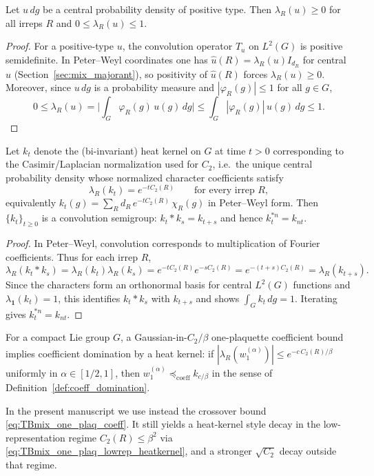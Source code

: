 \begin{lemma}\label{lem:pos_type_nonneg_coeff}
Let $u\,dg$ be a central probability density of positive type. Then $\lambda_R(u)\ge 0$ for all irreps $R$ and
$0\le \lambda_R(u)\le 1$.
\end{lemma}
\begin{proof}
For a positive-type $u$, the convolution operator $T_u$ on $L^2(G)$ is positive semidefinite.
In Peter--Weyl coordinates one has $\widehat u(R)=\lambda_R(u)I_{d_R}$ for central $u$ (Section~\ref{sec:mix_majorant}),
so positivity of $\widehat u(R)$ forces $\lambda_R(u)\ge 0$.
Moreover, since $u\,dg$ is a probability measure and $|\varphi_R(g)|\le 1$ for all $g\in G$,
\[
0\le \lambda_R(u)=\Big|\int_G \varphi_R(g)\,u(g)\,dg\Big|\le \int_G |\varphi_R(g)|\,u(g)\,dg\le 1.
\]
\end{proof}

\begin{lemma}\label{lem:heat_kernel_coeff}
Let $k_t$ denote the (bi-invariant) heat kernel on $G$ at time $t>0$ corresponding to the Casimir/Laplacian normalization used for $C_2$,
i.e.\ the unique central probability density whose normalized character coefficients satisfy
\[
\lambda_R(k_t)=e^{-tC_2(R)}
\qquad\text{for every irrep }R,
\]
equivalently
$
k_t(g)=\sum_R d_R\,e^{-tC_2(R)}\,\chi_R(g)
$
in Peter--Weyl form.
Then $\{k_t\}_{t\ge 0}$ is a convolution semigroup: $k_t*k_s=k_{t+s}$ and hence $k_t^{*n}=k_{nt}$.
\end{lemma}
\begin{proof}
In Peter--Weyl, convolution corresponds to multiplication of Fourier coefficients.
Thus for each irrep $R$,
\[
\lambda_R(k_t*k_s)=\lambda_R(k_t)\lambda_R(k_s)=e^{-tC_2(R)}e^{-sC_2(R)}=e^{-(t+s)C_2(R)}=\lambda_R(k_{t+s}).
\]
Since the characters form an orthonormal basis for central $L^2(G)$ functions and $\lambda_{\mathbf 1}(k_t)=1$,
this identifies $k_t*k_s$ with $k_{t+s}$ and shows $\int_G k_t\,dg=1$.
Iterating gives $k_t^{*n}=k_{nt}$.
\end{proof}


\begin{remark}\label{rem:plaq_as_heatkernel_dom}
For a compact Lie group $G$, a Gaussian-in-$C_2/\beta$ one-plaquette coefficient bound implies coefficient domination by a heat kernel:
if $|\lambda_R(w_1^{(\alpha)})|\le e^{-c\,C_2(R)/\beta}$ uniformly in $\alpha\in[1/2,1]$, then
$w_1^{(\alpha)} \preceq_{\mathrm{coeff}} k_{c/\beta}$ in the sense of Definition~\ref{def:coeff_domination}.

In the present manuscript we use instead the crossover bound \eqref{eq:TBmix_one_plaq_coeff}.
It still yields a heat-kernel style decay in the low-representation regime $C_2(R)\le \beta^2$ via \eqref{eq:TBmix_one_plaq_lowrep_heatkernel},
and a stronger $\sqrt{C_2}$ decay outside that regime.
\end{remark}



